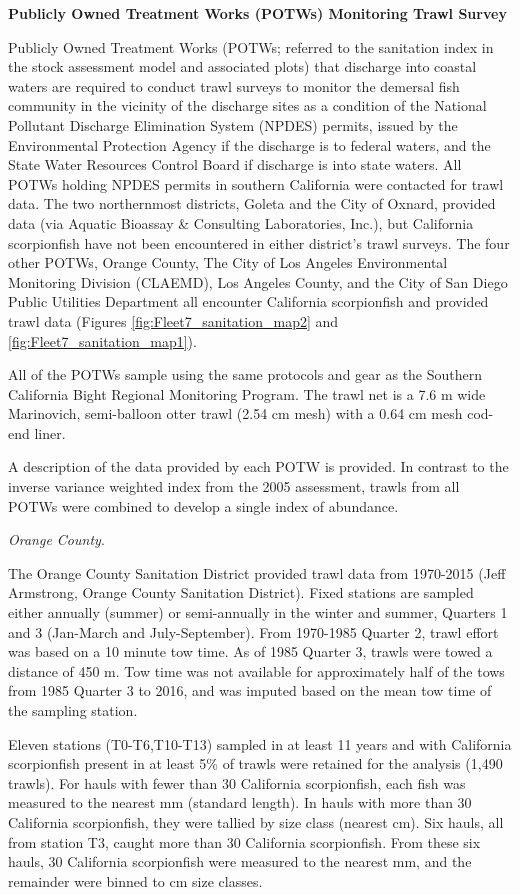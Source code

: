 \documentclass[12pt,]{article}
\begin{document}
\textbf{Publicly Owned Treatment Works (POTWs) Monitoring Trawl Survey}

Publicly Owned Treatment Works (POTWs; referred to the sanitation index
in the stock assessment model and associated plots) that discharge into
coastal waters are required to conduct trawl surveys to monitor the
demersal fish community in the vicinity of the discharge sites as a
condition of the National Pollutant Discharge Elimination System (NPDES)
permits, issued by the Environmental Protection Agency if the discharge
is to federal waters, and the State Water Resources Control Board if
discharge is into state waters. All POTWs holding NPDES permits in
southern California were contacted for trawl data. The two northernmost
districts, Goleta and the City of Oxnard, provided data (via Aquatic
Bioassay \& Consulting Laboratories, Inc.), but California scorpionfish
have not been encountered in either district's trawl surveys. The four
other POTWs, Orange County, The City of Los Angeles Environmental
Monitoring Division (CLAEMD), Los Angeles County, and the City of San
Diego Public Utilities Department all encounter California scorpionfish
and provided trawl data (Figures \ref{fig:Fleet7_sanitation_map2} and
\ref{fig:Fleet7_sanitation_map1}).

All of the POTWs sample using the same protocols and gear as the
Southern California Bight Regional Monitoring Program. The trawl net is
a 7.6 m wide Marinovich, semi-balloon otter trawl (2.54 cm mesh) with a
0.64 cm mesh cod-end liner.

A description of the data provided by each POTW is provided. In contrast
to the inverse variance weighted index from the 2005 assessment, trawls
from all POTWs were combined to develop a single index of abundance.

\emph{Orange County}.

The Orange County Sanitation District provided trawl data from 1970-2015
(Jeff Armstrong, Orange County Sanitation District). Fixed stations are
sampled either annually (summer) or semi-annually in the winter and
summer, Quarters 1 and 3 (Jan-March and July-September). From 1970-1985
Quarter 2, trawl effort was based on a 10 minute tow time. As of 1985
Quarter 3, trawls were towed a distance of 450 m. Tow time was not
available for approximately half of the tows from 1985 Quarter 3 to
2016, and was imputed based on the mean tow time of the sampling
station.

Eleven stations (T0-T6,T10-T13) sampled in at least 11 years and with
California scorpionfish present in at least 5\% of trawls were retained
for the analysis (1,490 trawls). For hauls with fewer than 30 California
scorpionfish, each fish was measured to the nearest mm (standard
length). In hauls with more than 30 California scorpionfish, they were
tallied by size class (nearest cm). Six hauls, all from station T3,
caught more than 30 California scorpionfish. From these six hauls, 30
California scorpionfish were measured to the nearest mm, and the
remainder were binned to cm size classes.
\end{document}
